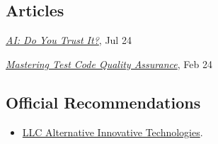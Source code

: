\documentclass{vl}
\begin{document}
    \subsection*{Articles}
    \begin{samepage}
        \emph{\href{https://dzone.com/articles/ai-do-you-trust-it}{AI: Do You Trust It?}}, Jul 24
    \end{samepage}
    \newline
    \begin{samepage}
        \emph{\href{https://dzone.com/articles/mastering-test-code-quality-assurance}{Mastering Test Code Quality
        Assurance}}, Feb 24
    \end{samepage}

    \subsection*{Official Recommendations}
    \begin{itemize}
        \item \href{https://github.com/volodya-lombrozo/volodya-lombrozo.github.io/blob/24eb2bbed8fac71c90ddef6ff4d93de8fb4f9f26/_cv/recommendations/letter_of_recommendation_ait.pdf}{LLC Alternative Innovative Technologies}.
    \end{itemize}
\end{document}
